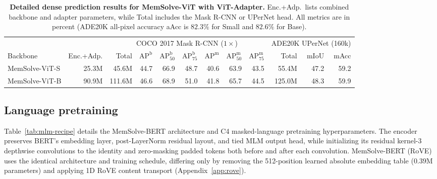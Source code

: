 \documentclass[10pt,twocolumn]{article}
\let\draftsmall\small
\renewcommand{\small}{\draftsmall\fontsize{9}{10}\selectfont}
\begin{document}
\begin{table}[!ht]
\centering
\small
\captionsetup{width=.94\linewidth}
\setlength{\tabcolsep}{5.2pt}
\renewcommand{\arraystretch}{1.04}
\begin{tabular}{lrrrrrrrrrrr}
\toprule
& & \multicolumn{7}{c}{COCO 2017 Mask R-CNN ($1\times$)} & \multicolumn{3}{c}{ADE20K UPerNet (160k)}\\
\cmidrule(lr){3-9}\cmidrule(l){10-12}
Backbone & Enc.+Adp. & Total & $\text{AP}^{\text{b}}$ & $\text{AP}^{\text{b}}_{50}$ & $\text{AP}^{\text{b}}_{75}$ & $\text{AP}^{\text{m}}$ & $\text{AP}^{\text{m}}_{50}$ & $\text{AP}^{\text{m}}_{75}$ & Total & mIoU & mAcc\\
\midrule
MemSolve-ViT-S & 25.3M & 45.6M & 44.7 & 66.9 & 48.7 & 40.6 & 63.9 & 43.5 & 55.4M & 47.2 & 59.2\\
MemSolve-ViT-B & 90.9M & 111.6M & 46.6 & 68.9 & 51.0 & 41.8 & 65.7 & 44.5 & 125.0M & 48.3 & 59.9\\
\bottomrule
\end{tabular}
\caption{\textbf{Detailed dense prediction results for MemSolve-ViT with ViT-Adapter.}
Enc.+Adp.\ lists combined backbone and adapter parameters, while Total includes
the Mask R-CNN or UPerNet head. All metrics are in percent (ADE20K all-pixel
accuracy aAcc is $82.3\%$ for Small and $82.6\%$ for Base).}
\label{tab:dense-detail}
\end{table}

\FloatBarrier
\subsection{Language pretraining}
\label{app:nlp}

Table~\ref{tab:mlm-recipe} details the MemSolve-BERT architecture and C4
masked-language pretraining hyperparameters.
The encoder preserves BERT's embedding layer, post-LayerNorm residual layout,
and tied MLM output head, while initializing its residual kernel-3 depthwise
convolutions to the identity and zero-masking padded tokens both before and
after each convolution.
MemSolve-BERT (RoVE) uses the identical architecture and training schedule,
differing only by removing the 512-position learned absolute embedding table
($0.39$M parameters) and applying 1D RoVE content transport
(Appendix~\ref{app:rove}).
\end{document}

